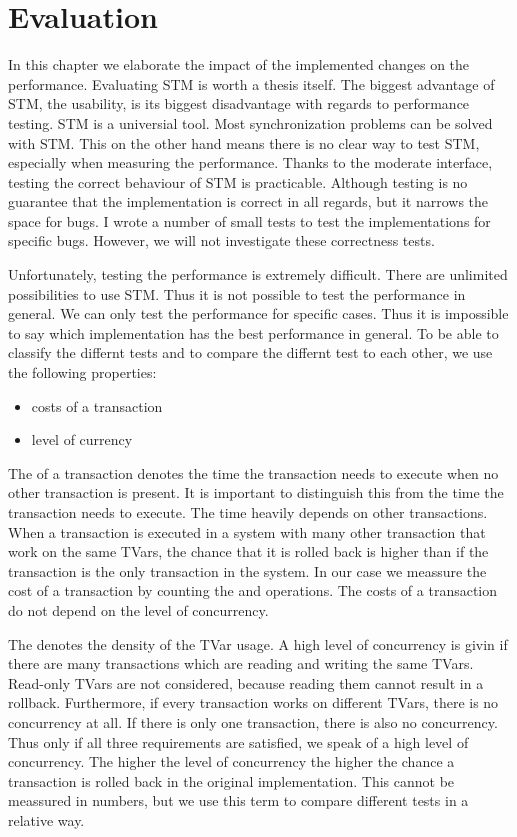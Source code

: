 
\chapter{Evaluation} 

\label{Chapter4}
In this chapter we elaborate the impact of the implemented changes on the performance.
Evaluating STM is worth a thesis itself. The biggest advantage of STM, the usability, is
its biggest disadvantage with regards to performance testing. STM is a universial tool. Most
synchronization problems can be solved with STM. This on the other hand means there
is no clear way to test STM, especially when measuring the performance. Thanks to
the moderate interface, testing the correct behaviour of STM is practicable. Although testing 
is no guarantee that the implementation is correct in all regards, but it narrows the 
space for bugs. I wrote a number of small tests to test the implementations for specific bugs.
However, we will not investigate these correctness tests.


Unfortunately, testing the performance is extremely difficult. There are unlimited 
possibilities to use STM. Thus it is not possible to test the performance in general.
We can only test the performance for specific cases. Thus it is impossible to say which 
implementation has the best performance in general. To be able to classify the differnt 
tests and to compare the differnt test to each other, we use the following properties: 
\begin{itemize}
 \item costs of a transaction
 \item level of currency
\end{itemize}
The  of a transaction denotes the time the transaction needs to execute when no 
other transaction is present.  
It is important to distinguish this from the time the transaction needs to execute. The
time heavily depends on other transactions. When a transaction is executed in a system
with many other transaction that work on the same TVars, the chance that it is rolled 
back is higher than if the transaction is the only transaction in the system. In our case 
we meassure the cost of a transaction by counting the  and  
operations. The costs of a transaction do not depend on the level of concurrency.

The  denotes the density of the TVar usage. A high level of 
concurrency is givin if there are many transactions which are reading and writing the same
TVars. Read-only TVars are not considered, because reading them cannot result in a rollback.
Furthermore, if every transaction works on different TVars, there is no concurrency at all. If there 
is only one transaction, there is also no concurrency. Thus only if all three requirements are satisfied,
we speak of a high level of concurrency. The higher the level of concurrency the higher the chance 
a transaction is rolled back in the original implementation. This cannot be meassured in numbers, but we use this term
to compare different tests in a relative way.

